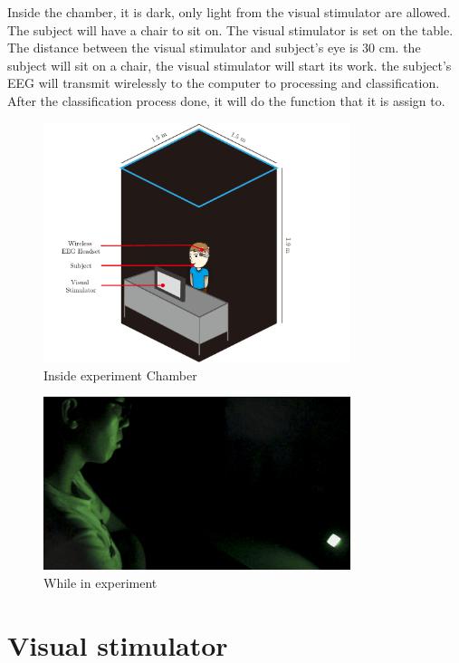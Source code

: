 \hspace{1.5cm}Inside the chamber, it is dark, only light from the visual stimulator are allowed. The subject will have a chair to sit on. The visual stimulator is set on the table. The distance between the visual stimulator and subject's eye is 30 cm. the subject will sit on a chair, the visual stimulator will start its work. the subject's EEG will transmit wirelessly to the computer to processing and classification. After the classification process done, it will do the function that it is assign to. \\
\begin{figure}[ht]
	\centering
	\includegraphics[width=0.8\textwidth]{chapter6/dark_wire_inside.pdf}
	\caption{Inside experiment Chamber}
\end{figure}

\begin{figure}[ht]
	\centering
	\includegraphics[width=0.8\textwidth]{chapter6/experi.jpg}
	\caption{While in experiment}
\end{figure}

\section{Visual stimulator}

